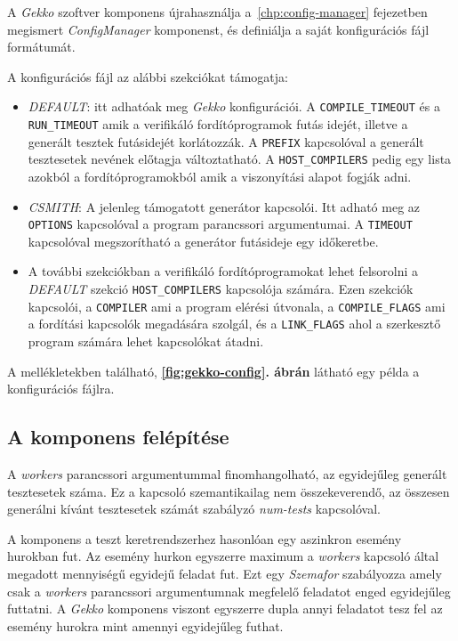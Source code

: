         A \textit{Gekko} szoftver komponens újrahasználja a~\ref{chp:config-manager} fejezetben megismert
        \textit{ConfigManager} komponenst, és definiálja a saját konfigurációs fájl formátumát.

        A konfigurációs fájl az alábbi szekciókat támogatja:

        \begin{itemize}
            \item \textit{DEFAULT}: itt adhatóak meg \textit{Gekko} konfigurációi. A \verb|COMPILE_TIMEOUT| és a
                  \verb|RUN_TIMEOUT| amik a verifikáló fordítóprogramok futás idejét, illetve a generált tesztek
                  futásidejét korlátozzák. A \verb|PREFIX| kapcsolóval a generált tesztesetek nevének előtagja
                  változtatható. A \verb|HOST_COMPILERS| pedig egy lista azokból a fordítóprogramokból amik a viszonyítási
                  alapot fogják adni.
            \item \textit{CSMITH}: A jelenleg támogatott generátor kapcsolói. Itt adható meg az \verb|OPTIONS| kapcsolóval
                  a program parancssori argumentumai. A \verb|TIMEOUT| kapcsolóval megszorítható a generátor futásideje egy
                  időkeretbe.
            \item A további szekciókban a verifikáló fordítóprogramokat lehet felsorolni a \textit{DEFAULT} szekció
                  \verb|HOST_COMPILERS| kapcsolója számára. Ezen szekciók kapcsolói, a \verb|COMPILER| ami a program
                  elérési útvonala, a \verb|COMPILE_FLAGS| ami a fordítási kapcsolók megadására szolgál, és a
                  \verb|LINK_FLAGS| ahol a szerkesztő program számára lehet kapcsolókat átadni.
        \end{itemize}

        A mellékletekben található, \textbf{\ref{fig:gekko-config}. ábrán} látható egy példa a konfigurációs fájlra.

    \subsection{A komponens felépítése}

        A \textit{workers} parancssori argumentummal finomhangolható, az egyidejűleg generált tesztesetek száma. Ez a
        kapcsoló szemantikailag nem összekeverendő, az összesen generálni kívánt tesztesetek számát szabályzó
        \textit{num-tests} kapcsolóval.

        A komponens a teszt keretrendszerhez hasonlóan egy aszinkron esemény hurokban fut. Az esemény hurkon egyszerre
        maximum a \textit{workers} kapcsoló által megadott mennyiségű egyidejű feladat fut. Ezt egy \textit{Szemafor}
        szabályozza amely csak a \textit{workers} parancssori argumentumnak megfelelő feladatot enged egyidejűleg
        futtatni. A \textit{Gekko} komponens viszont egyszerre dupla annyi feladatot tesz fel az esemény hurokra mint
        amennyi egyidejűleg futhat.

